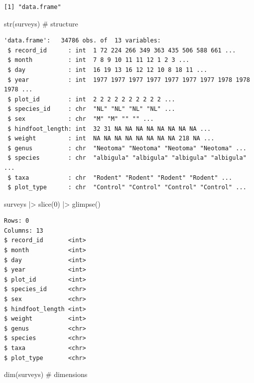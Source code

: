 \documentclass[
  letterpaper,
  DIV=11,
  numbers=noendperiod]{scrreprt}
\newenvironment{Shaded}{\begin{snugshade}}{\end{snugshade}}
\newcommand{\CommentTok}[1]{\textcolor[rgb]{0.37,0.37,0.37}{#1}}
\newcommand{\DecValTok}[1]{\textcolor[rgb]{0.68,0.00,0.00}{#1}}
\newcommand{\FunctionTok}[1]{\textcolor[rgb]{0.28,0.35,0.67}{#1}}
\newcommand{\NormalTok}[1]{\textcolor[rgb]{0.00,0.23,0.31}{#1}}
\newcommand{\SpecialCharTok}[1]{\textcolor[rgb]{0.37,0.37,0.37}{#1}}
\begin{document}
\begin{verbatim}
[1] "data.frame"
\end{verbatim}

\begin{Shaded}
\begin{Highlighting}[]
\FunctionTok{str}\NormalTok{(surveys) }\CommentTok{\# structure}
\end{Highlighting}
\end{Shaded}

\begin{verbatim}
'data.frame':   34786 obs. of  13 variables:
 $ record_id      : int  1 72 224 266 349 363 435 506 588 661 ...
 $ month          : int  7 8 9 10 11 11 12 1 2 3 ...
 $ day            : int  16 19 13 16 12 12 10 8 18 11 ...
 $ year           : int  1977 1977 1977 1977 1977 1977 1977 1978 1978 1978 ...
 $ plot_id        : int  2 2 2 2 2 2 2 2 2 2 ...
 $ species_id     : chr  "NL" "NL" "NL" "NL" ...
 $ sex            : chr  "M" "M" "" "" ...
 $ hindfoot_length: int  32 31 NA NA NA NA NA NA NA NA ...
 $ weight         : int  NA NA NA NA NA NA NA NA 218 NA ...
 $ genus          : chr  "Neotoma" "Neotoma" "Neotoma" "Neotoma" ...
 $ species        : chr  "albigula" "albigula" "albigula" "albigula" ...
 $ taxa           : chr  "Rodent" "Rodent" "Rodent" "Rodent" ...
 $ plot_type      : chr  "Control" "Control" "Control" "Control" ...
\end{verbatim}

\begin{Shaded}
\begin{Highlighting}[]
\NormalTok{surveys }\SpecialCharTok{|\textgreater{}} 
  \FunctionTok{slice}\NormalTok{(}\DecValTok{0}\NormalTok{) }\SpecialCharTok{|\textgreater{}} 
  \FunctionTok{glimpse}\NormalTok{()}
\end{Highlighting}
\end{Shaded}

\begin{verbatim}
Rows: 0
Columns: 13
$ record_id       <int> 
$ month           <int> 
$ day             <int> 
$ year            <int> 
$ plot_id         <int> 
$ species_id      <chr> 
$ sex             <chr> 
$ hindfoot_length <int> 
$ weight          <int> 
$ genus           <chr> 
$ species         <chr> 
$ taxa            <chr> 
$ plot_type       <chr> 
\end{verbatim}

\begin{Shaded}
\begin{Highlighting}[]
\FunctionTok{dim}\NormalTok{(surveys) }\CommentTok{\# dimensions}
\end{Highlighting}
\end{Shaded}
\end{document}
